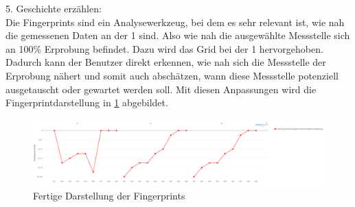 5. Geschichte erzählen:\\
Die Fingerprints sind ein Analysewerkzeug, bei dem es sehr relevant ist, wie nah die gemessenen Daten an der 1 sind. Also wie nah die ausgewählte Messstelle sich an 100\% Erprobung befindet. Dazu wird das Grid bei der 1 hervorgehoben. Dadurch kann der Benutzer direkt erkennen, wie nah sich die Messstelle der Erprobung nähert und somit auch abschätzen, wann diese Messstelle potenziell ausgetauscht oder gewartet werden soll. Mit diesen Anpassungen wird die Fingerprintdarstellung in \ref{fig:fingerprints_finished} abgebildet.
\begin{figure}[!h]
    \centering
    \includegraphics[width=1\linewidth]{gfx/fingerprints_finished.png}
    \caption{Fertige Darstellung der Fingerprints}
    \label{fig:fingerprints_finished}
\end{figure}
